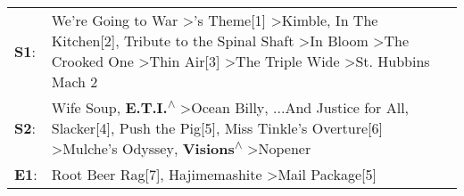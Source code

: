 \begin{supertabular}{p{0.03\textwidth}p{0.92\textwidth}}
 \textbf{S1}:  &  We're Going to War\textsuperscript{} \textgreater {}'s Theme[1]\textsuperscript{} \textgreater \enspace Kimble\textsuperscript{}, \enspace In The Kitchen[2]\textsuperscript{}, \enspace Tribute to the Spinal Shaft\textsuperscript{} \textgreater \enspace In Bloom\textsuperscript{} \textgreater \enspace The Crooked One\textsuperscript{} \textgreater \enspace Thin Air[3]\textsuperscript{} \textgreater \enspace The Triple Wide\textsuperscript{} \textgreater \enspace St. Hubbins Mach 2\textsuperscript{}  \enspace  \\
 \textbf{S2}:  &                                    Wife Soup\textsuperscript{}, \enspace \textbf{E.T.I.\textsuperscript{$\wedge$}} \textgreater \enspace Ocean Billy\textsuperscript{}, \enspace ...And Justice for All\textsuperscript{}, \enspace Slacker[4]\textsuperscript{}, \enspace Push the Pig[5]\textsuperscript{}, \enspace Miss Tinkle's Overture[6]\textsuperscript{} \textgreater \enspace Mulche's Odyssey\textsuperscript{}, \enspace \textbf{Visions\textsuperscript{$\wedge$}} \textgreater \enspace Nopener\textsuperscript{}  \enspace  \\
 \textbf{E1}:  &                                                                                                                                                                                                                                                                                                                                                                                             Root Beer Rag[7]\textsuperscript{}, \enspace Hajimemashite\textsuperscript{} \textgreater \enspace Mail Package[5]\textsuperscript{}  \enspace  \\
\end{supertabular}
